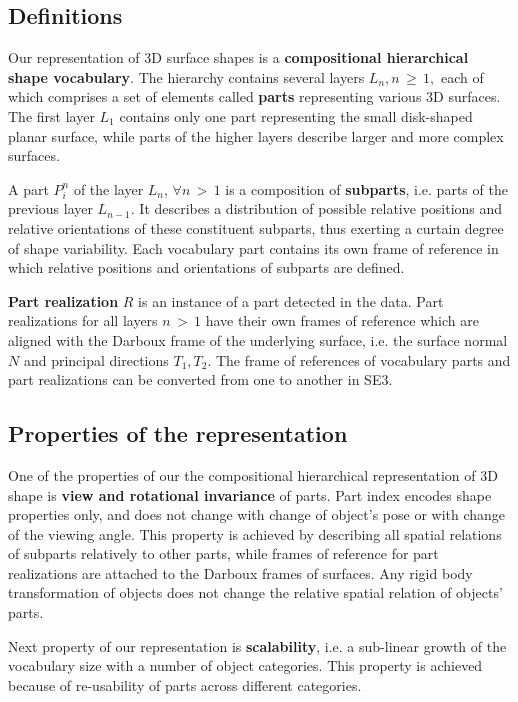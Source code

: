 \documentclass[runningheads]{llncs}
\begin{document}
\subsection{Definitions\label{sec:Definitions}}

Our representation of 3D surface shapes is a \textbf{compositional
hierarchical shape vocabulary}. The hierarchy contains several
layers $L_n, n\,{\geqslant}\,1,$ each of which comprises a set of
elements called \textbf{parts} representing various 3D surfaces. The
first layer $L_1$ contains only one part representing the small
disk-shaped planar surface, while parts of the higher layers
describe larger and more complex surfaces.

A part $P_{i}^n$ of the layer $L_n$, $\forall n\,{>}\,1$ is a
composition of \textbf{subparts}, i.e. parts of the previous layer
$L_{n-1}$. It describes a distribution of possible relative
positions and relative orientations of these constituent subparts,
thus exerting a curtain degree of shape variability. Each vocabulary
part contains its own frame of reference in which relative positions
and orientations of subparts are defined.

\textbf{Part realization} $R$ is an instance of a part detected in
the data. Part realizations for all layers $n\,{>}\,1$ have their
own frames of reference which are aligned with the Darboux frame of
the underlying surface, i.e. the surface normal $N$ and principal
directions $T_1, T_2$. The frame of references of vocabulary parts
and part realizations can be converted from one to another in SE3.

\subsection{Properties of the representation\label{sec:Properties}}

One of the properties of our the compositional hierarchical
representation of 3D shape is \textbf{view and rotational
invariance} of parts. Part index encodes shape properties only, and
does not change with change of object's pose or with change of the
viewing angle. This property is achieved by describing all spatial
relations of subparts relatively to other parts, while frames of
reference for part realizations are attached to the Darboux frames
of surfaces. Any rigid body transformation of objects does not
change the relative spatial relation of objects' parts.

Next property of our representation is \textbf{scalability}, i.e. a
sub-linear growth of the vocabulary size with a number of object
categories. This property is achieved because of re-usability of
parts across different categories.
\end{document}
